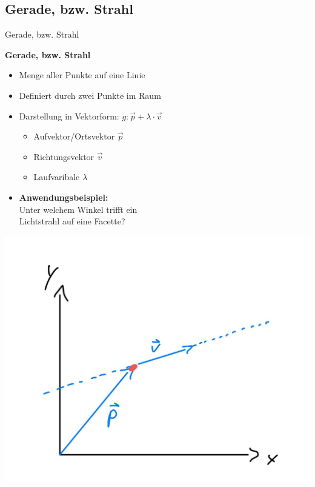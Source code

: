 \documentclass[10pt,aspectratio=169]{beamer}
\begin{document}
  \subsection{Gerade, bzw. Strahl}
  \begin{frame}{Gerade, bzw. Strahl}
    \begin{minipage}{8cm}
      \textbf{Gerade, bzw. Strahl}
      \begin{itemize}
        \item Menge aller Punkte auf eine Linie
        \item Definiert durch zwei Punkte im Raum
        \item Darstellung in Vektorform: $g: \vec{p} + \lambda \cdot \vec{v}$
        \begin{itemize}  
          \item Aufvektor/Ortsvektor $\vec{p}$
          \item Richtungsvektor $\vec{v}$
          \item Laufvaribale $\lambda$
        \end{itemize}
        \item \textbf{Anwendungsbeispiel:}\\Unter welchem Winkel trifft ein\\Lichtstrahl auf eine Facette?
      \end{itemize}  
    \end{minipage}
    \begin{minipage}{4cm}
      \includegraphics[scale=0.125]{sketch_gerade}
    \end{minipage}
  \end{frame}
\end{document}
